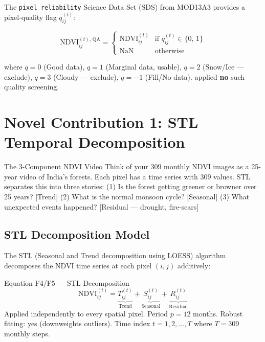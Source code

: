 \documentclass[12pt, a4paper]{article}
\begin{document}
The \texttt{pixel\_reliability} Science Data Set (SDS) from MOD13A3
provides a pixel-quality flag $q_{ij}^{(t)}$:

\begin{equation}
  \mathrm{NDVI}_{ij}^{(t),\,\mathrm{QA}} =
  \begin{cases}
    \mathrm{NDVI}_{ij}^{(t)} & \text{if } q_{ij}^{(t)} \in \{0,\,1\} \\[4pt]
    \mathrm{NaN}             & \text{otherwise}
  \end{cases}
  \label{eq:qa_filter}
\end{equation}

where $q = 0$ (Good data), $q = 1$ (Marginal data, usable),
$q = 2$ (Snow/Ice --- exclude), $q = 3$ (Cloudy --- exclude),
$q = -1$ (Fill/No-data).
\citet{biswas2025} applied \textbf{no} such quality screening.

\section{Novel Contribution 1: STL Temporal Decomposition}
\label{sec:stl}

\begin{simplebox}{The 3-Component NDVI Video}
Think of your 309 monthly NDVI images as a 25-year video of India's
forests. Each pixel has a time series with 309 values.
STL separates this into three stories:
(1) Is the forest getting greener or browner over 25 years? [Trend]
(2) What is the normal monsoon cycle? [Seasonal]
(3) What unexpected events happened? [Residual — drought, fire-scars]
\end{simplebox}

\subsection{STL Decomposition Model}

The STL (Seasonal and Trend decomposition using LOESS) algorithm
\citep{cleveland1990stl} decomposes the NDVI time series at each pixel
$(i,j)$ additively:

\begin{mathbox}{Equation F4/F5 — STL Decomposition}
\begin{equation}
  \mathrm{NDVI}_{ij}^{(t)} =
  \underbrace{T_{ij}^{(t)}}_{\text{Trend}} +
  \underbrace{S_{ij}^{(t)}}_{\text{Seasonal}} +
  \underbrace{R_{ij}^{(t)}}_{\text{Residual}}
  \label{eq:stl}
\end{equation}
Applied independently to every spatial pixel.
Period $p = 12$ months. Robust fitting: yes (downweights outliers).
Time index $t = 1, 2, \ldots, T$ where $T = 309$ monthly steps.
\end{mathbox}
\end{document}
